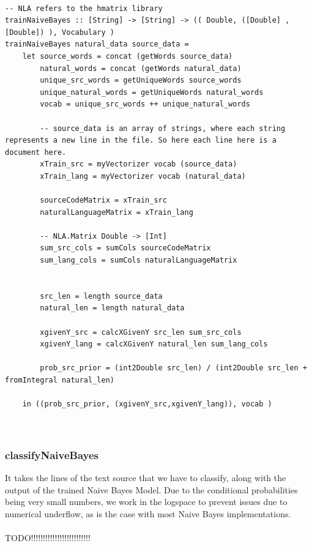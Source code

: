 \documentclass[12pt]{scrreprt}
\begin{document}
\begin{verbatim}

-- NLA refers to the hmatrix library
trainNaiveBayes :: [String] -> [String] -> (( Double, ([Double] , [Double]) ), Vocabulary )
trainNaiveBayes natural_data source_data = 
    let source_words = concat (getWords source_data)
        natural_words = concat (getWords natural_data)
        unique_src_words = getUniqueWords source_words
        unique_natural_words = getUniqueWords natural_words
        vocab = unique_src_words ++ unique_natural_words

        -- source_data is an array of strings, where each string represents a new line in the file. So here each line here is a document here. 
        xTrain_src = myVectorizer vocab (source_data)
        xTrain_lang = myVectorizer vocab (natural_data)

        sourceCodeMatrix = xTrain_src
        naturalLanguageMatrix = xTrain_lang

        -- NLA.Matrix Double -> [Int]
        sum_src_cols = sumCols sourceCodeMatrix
        sum_lang_cols = sumCols naturalLanguageMatrix


        src_len = length source_data
        natural_len = length natural_data

        xgivenY_src = calcXGivenY src_len sum_src_cols
        xgivenY_lang = calcXGivenY natural_len sum_lang_cols

        prob_src_prior = (int2Double src_len) / (int2Double src_len + fromIntegral natural_len)

    in ((prob_src_prior, (xgivenY_src,xgivenY_lang)), vocab )
    
    
\end{verbatim}





\subsubsection{classifyNaiveBayes}

It takes the lines of the text source that we have to classify, along with the output of the trained Naive Bayes Model. Due to the conditional probabilities being very small numbers, we work in the logspace to prevent issues due to numerical underflow, as is the case with most Naive Bayes implementations. \\ 
\\ TODO!!!!!!!!!!!!!!!!!!!!!!!!!
\end{document}
